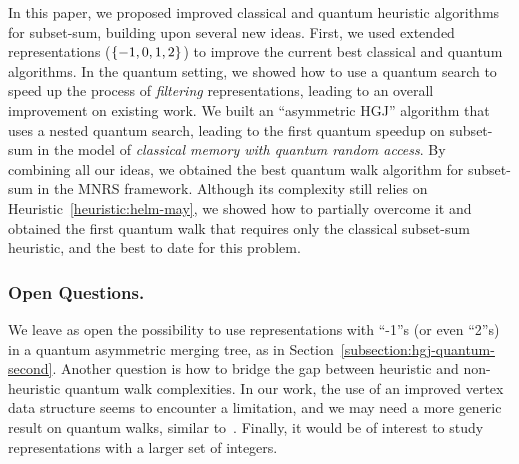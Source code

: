 
In this paper, we proposed improved classical and quantum heuristic algorithms for subset-sum, building upon several new ideas. First, we used extended representations ($\{-1,0,1,2\}$) to improve the current best classical and quantum algorithms. In the quantum setting, we showed how to use a quantum search to speed up the process of \emph{filtering} representations, leading to an overall improvement on existing work. We built an ``asymmetric HGJ'' algorithm that uses a nested quantum search, leading to the first quantum speedup on subset-sum in the model of \emph{classical memory with quantum random access}. By combining all our ideas, we obtained the best quantum walk algorithm for subset-sum in the MNRS framework. Although its complexity still relies on Heuristic~\ref{heuristic:helm-may}, we showed how to partially overcome it and obtained the first quantum walk that requires only the classical subset-sum heuristic, and the best to date for this problem. %


\subsubsection*{Open Questions.}
We leave as open the possibility to use representations with ``-1''s (or even ``2''s) in a quantum asymmetric merging tree, as in Section~\ref{subsection:hgj-quantum-second}. Another question is how to bridge the gap between heuristic and non-heuristic quantum walk complexities. In our work, the use of an improved vertex data structure seems to encounter a limitation, and we may need a more generic result on quantum walks, similar to~\cite{DBLP:journals/mst/Ambainis10}. Finally, it would be of interest to study representations with a larger set of integers.




